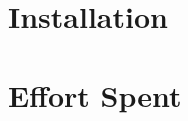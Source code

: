 \clearpage
\section{Installation}
\label{sect:installing}


\clearpage
\section{Effort Spent}
\label{sect:effort}



% 
% 



